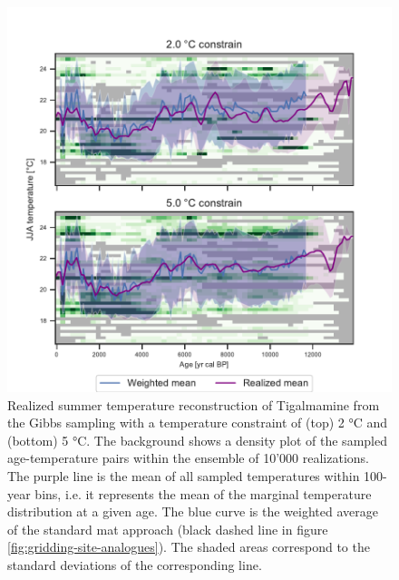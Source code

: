 \begin{refsection}
\begin{figure}
	\includegraphics[width=\linewidth]{gridding-figures/realized-temperature-tigalmamine.pdf}
	\caption[Realized summer temperature reconstruction of Tigalmamine with different constraints]{Realized summer temperature reconstruction of Tigalmamine from the Gibbs sampling with a temperature constraint of (top) 2 °C and (bottom) 5 °C. The background shows a density plot of the sampled age-temperature pairs within the ensemble of 10'000 realizations. The purple line is the mean of all sampled temperatures within 100-year bins, i.e. it represents the mean of the marginal temperature distribution at a given age. The blue curve is the weighted average of the standard \gls{mat} approach (black dashed line in figure \ref{fig:gridding-site-analogues}). The shaded areas correspond to the standard deviations of the corresponding line.}
	\label{fig:gridding-tigal-recon}
\end{figure}


\end{refsection}
